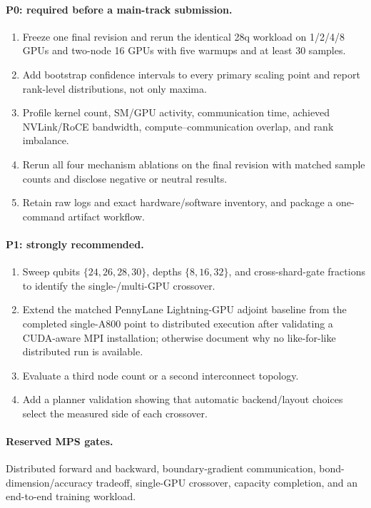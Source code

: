 \documentclass[10pt,twocolumn]{article}
\begin{document}
\paragraph{P0: required before a main-track submission.}
\begin{enumerate}[leftmargin=*,nosep]
  \item Freeze one final revision and rerun the identical 28q workload on
  1/2/4/8 GPUs and two-node 16 GPUs with five warmups and at least 30 samples.
  \item Add bootstrap confidence intervals to every primary scaling point and
  report rank-level distributions, not only maxima.
  \item Profile kernel count, SM/GPU activity, communication time, achieved
  NVLink/RoCE bandwidth, compute--communication overlap, and rank imbalance.
  \item Rerun all four mechanism ablations on the final revision with matched
  sample counts and disclose negative or neutral results.
  \item Retain raw logs and exact hardware/software inventory, and package a
  one-command artifact workflow.
\end{enumerate}

\paragraph{P1: strongly recommended.}
\begin{enumerate}[leftmargin=*,nosep]
  \item Sweep qubits \(\{24,26,28,30\}\), depths \(\{8,16,32\}\), and
  cross-shard-gate fractions to identify the single-/multi-GPU crossover.
  \item Extend the matched PennyLane Lightning-GPU adjoint baseline from the
  completed single-A800 point to distributed execution after validating a
  CUDA-aware MPI installation; otherwise document why no like-for-like
  distributed run is available.
  \item Evaluate a third node count or a second interconnect topology.
  \item Add a planner validation showing that automatic backend/layout choices
  select the measured side of each crossover.
\end{enumerate}

\paragraph{Reserved MPS gates.}
Distributed forward and backward, boundary-gradient communication,
bond-dimension/accuracy tradeoff, single-GPU crossover, capacity completion,
and an end-to-end training workload.
\end{document}
